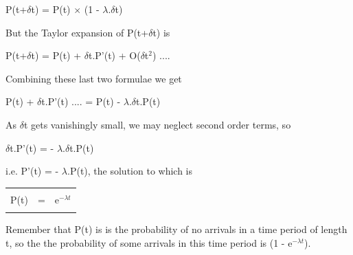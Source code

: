 \begin{center}
P(t+$\delta$t) = P(t) $\times$ (1 - $\lambda$.$\delta$t)
\end{center}

But the Taylor expansion of P(t+$\delta$t) is

\begin{center}
P(t+$\delta$t)  =  P(t)  +  $\delta$t.P'(t) + O($\delta$t$^2$) ....
\end{center}

Combining these last two formulae we get

\begin{center}
P(t)  +  $\delta$t.P'(t) .... =  P(t) - $\lambda$.$\delta$t.P(t)
\end{center}


As $\delta$t gets vanishingly small, we may neglect second order terms,
so 

\begin{center}
$\delta$t.P'(t) = - $\lambda$.$\delta$t.P(t)
\end{center}

i.e. P'(t) = - $\lambda$.P(t), the solution to which is 


\begin{table}[hbt]\centering
\begin{tabular}{|| cc c||}
\hline
&&\\
\hspace*{0.25in} P(t)   & = &  e$^{-\lambda t}$ \hspace*{0.25in}\\
&&\\
\hline
\end{tabular}
\end{table}

Remember that P(t) is is the probability of no arrivals in 
a time period of length t, so the the probability of 
some arrivals in this time period is (1 - e$^{-\lambda t}$).

